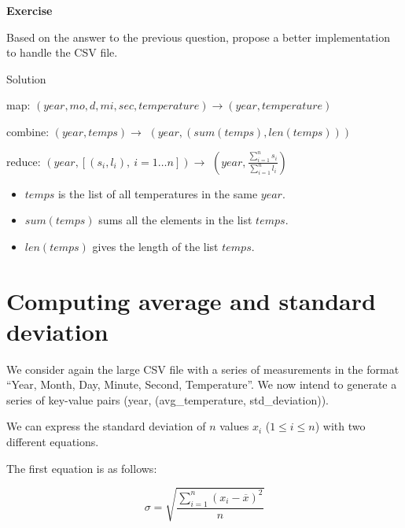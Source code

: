 \documentclass[
]{article}
\providecommand{\tightlist}{%
  \setlength{\itemsep}{0pt}\setlength{\parskip}{0pt}}
\newenvironment{infobox}[1]
  {
  \begin{itemize}
  \renewcommand{\labelitemi}{
    \raisebox{-.7\height}[0pt][0pt]{
      
    }
  }
  \setlength{\fboxsep}{1em}
  \begin{whitebox}
  \item
  }
  {
  \end{whitebox}
  \end{itemize}
  }
\theoremstyle{definition}
\theoremstyle{definition}
\theoremstyle{definition}
\theoremstyle{remark}
\let\BeginKnitrBlock\begin \let\EndKnitrBlock\end
\begin{document}
\begin{infobox}{exercisebox}

\textbf{Exercise}

\BeginKnitrBlock{exercise}
\protect\hypertarget{exr:unnamed-chunk-4}{}{\label{exr:unnamed-chunk-4} }
Based on the answer to the previous question,
propose a better implementation to handle the CSV file.
\EndKnitrBlock{exercise}

\end{infobox}

Solution

\begin{infobox}{exercisebox}

map: \((year, mo, d, mi, sec, temperature) \rightarrow (year, temperature)\)

combine: \((year, temps) \rightarrow\) \((year, (sum(temps), len(temps)))\)

reduce: \((year, [(s_i, l_i),\ i=1\dots n]) \rightarrow\) \((year, \frac{\sum_{i=1}^n s_i}{\sum_{i=1}^n l_i})\)

\begin{itemize}
\tightlist
\item
  \(temps\) is the list of all temperatures in the same \(year\).
\item
  \(sum(temps)\) sums all the elements in the list \(temps\).
\item
  \(len(temps)\) gives the length of the list \(temps\).
\end{itemize}

\end{infobox}

\hypertarget{computing-average-and-standard-deviation}{%
\section{Computing average and standard deviation}\label{computing-average-and-standard-deviation}}

We consider again the large CSV file
with a series of measurements in the format ``Year, Month, Day, Minute, Second, Temperature''.
We now intend to generate a series of key-value pairs (year, (avg\_temperature, std\_deviation)).

We can express the standard deviation of \(n\) values \(x_i\) (\(1 \leq i \leq n\)) with two different
equations.

The first equation is as follows:

\[
\sigma = \sqrt{\frac{\sum_{i=1}^n (x_i - \overline{x})^2}{n}} 
\]
\end{document}
